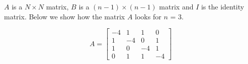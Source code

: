 $A$ is a $N \times N$ matrix, $B$ is a $(n-1) \times (n-1)$ matrix and $I$ is the identity matrix. Below we show how the matrix $A$ looks for $n$ = 3.

$$
A = \begin{bmatrix}
 -4 &  1 &  1 &  0 \\
  1 & -4 &  0 &  1 \\
  1 &  0 & -4 &  1 \\
  0 &  1 &  1 & -4
\end{bmatrix}
$$




